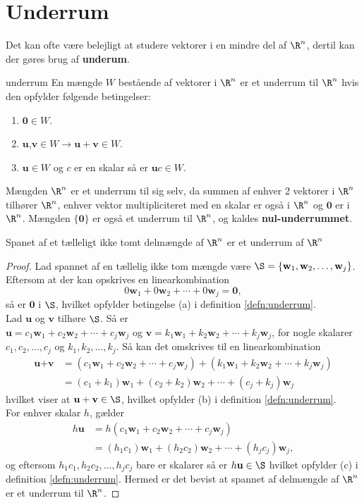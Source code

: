 \section{Underrum}
Det kan ofte være belejligt at studere vektorer i en mindre del af $\R^n$, dertil kan der gøres brug af \textbf{underum}.
\begin{defn}{}{underrum}
En mængde $W$ bestående af vektorer i $\R^n$ er et underrum til $\R^n$ hvis den opfylder følgende betingelser:	
\begin{enumerate}[label=(\alph*)]
	\item  $\textbf{0}\in W$.
	\item $\textbf{u}$,$\textbf{v} \in W \rightarrow \textbf{u}+\textbf{v} \in W $.
	\item $\textbf{u} \in W$ og $c$ er en skalar så er $\textbf{u}c \in W$.
\end{enumerate}
\end{defn}
\noindent
Mængden $\R^n$ er et underrum til sig selv, da summen af enhver 2 vektorer i $\R^n$ tilhører $\R^n$, enhver vektor multipliciteret med en skalar er også i $\R^n$ og $\textbf{0}$ er i $\R^n$. Mængden $\{\textbf{0}\}$ er også et underrum til $\R^n$, og kaldes \textbf{nul-underrummet}.


\begin{thm}{}{}
Spanet af et tælleligt ikke tomt delmængde af $\R^n$ er et underrum af $\R^n$
\end{thm}
\begin{proof}
Lad spannet af en tællelig ikke tom mængde være 
$\S=\{\textbf{w}_1 , \textbf{w}_2 , \ldots , \textbf{w}_j\}$.
Eftersom at der kan opskrives en linearkombination $$0\textbf{w}_1 + 0\textbf{w}_2 + \cdots + 0\textbf{w}_j=\textbf{0},$$ så er $\textbf{0}$ i  $\S$, hvilket opfylder betingelse (a) i definition \ref{defn:underrum}.\\
Lad $\textbf{u}$ og $\textbf{v}$ tilhøre $\S$. Så er\\
$\textbf{u}=c_1\textbf{w}_1+c_2\textbf{w}_2+\cdots+c_j\textbf{w}_j$ og $\textbf{v}=k_1\textbf{w}_1+k_2\textbf{w}_2+\cdots+k_j\textbf{w}_j$, for nogle skalarer $c_1,c_2,\ldots,c_j$ og $k_1,k_2,\ldots,k_j$. Så kan det omskrives til en linearkombination
\begin{align*}
\textbf{u}+\textbf{v}&=(c_1\textbf{w}_1+c_2\textbf{w}_2+\cdots+c_j\textbf{w}_j)+(k_1\textbf{w}_1+k_2\textbf{w}_2+\cdots+k_j\textbf{w}_j)\\
&=(c_1+k_1)\textbf{w}_1+(c_2+k_2)\textbf{w}_2+\cdots+(c_j+k_j)\textbf{w}_j
\end{align*}
hvilket viser at $\textbf{u}+\textbf{v}\in \S$, hvilket opfylder (b) i definition \ref{defn:underrum}.\\
For enhver skalar $h$, gælder
\begin{align*}
h\textbf{u}&=h(c_1\textbf{w}_1+c_2\textbf{w}_2+\cdots+c_j\textbf{w}_j)\\
&=(h_1c_1)\textbf{w}_1+(h_2c_2)\textbf{w}_2+\cdots+(h_jc_j)\textbf{w}_j,
\end{align*}
og eftersom $h_1c_1,h_2c_2,\ldots,h_jc_j$ bare er skalarer så er $h\textbf{u}\in \S$ hvilket opfylder (c) i definition \ref{defn:underrum}.
Hermed er det bevist at spannet af delmængde af $\R^n$ er et underrum til $\R^n$.
\end{proof}

